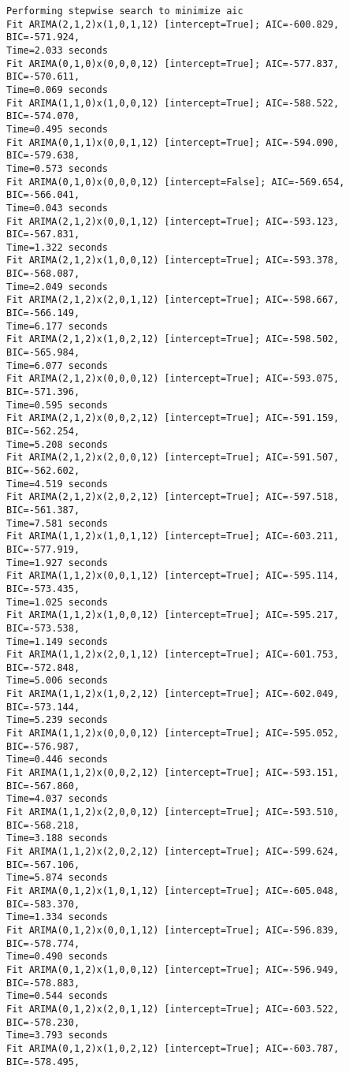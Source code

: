\documentclass[11pt]{article}
\begin{document}
    \begin{Verbatim}[commandchars=\\\{\}]
Performing stepwise search to minimize aic
Fit ARIMA(2,1,2)x(1,0,1,12) [intercept=True]; AIC=-600.829, BIC=-571.924,
Time=2.033 seconds
Fit ARIMA(0,1,0)x(0,0,0,12) [intercept=True]; AIC=-577.837, BIC=-570.611,
Time=0.069 seconds
Fit ARIMA(1,1,0)x(1,0,0,12) [intercept=True]; AIC=-588.522, BIC=-574.070,
Time=0.495 seconds
Fit ARIMA(0,1,1)x(0,0,1,12) [intercept=True]; AIC=-594.090, BIC=-579.638,
Time=0.573 seconds
Fit ARIMA(0,1,0)x(0,0,0,12) [intercept=False]; AIC=-569.654, BIC=-566.041,
Time=0.043 seconds
Fit ARIMA(2,1,2)x(0,0,1,12) [intercept=True]; AIC=-593.123, BIC=-567.831,
Time=1.322 seconds
Fit ARIMA(2,1,2)x(1,0,0,12) [intercept=True]; AIC=-593.378, BIC=-568.087,
Time=2.049 seconds
Fit ARIMA(2,1,2)x(2,0,1,12) [intercept=True]; AIC=-598.667, BIC=-566.149,
Time=6.177 seconds
Fit ARIMA(2,1,2)x(1,0,2,12) [intercept=True]; AIC=-598.502, BIC=-565.984,
Time=6.077 seconds
Fit ARIMA(2,1,2)x(0,0,0,12) [intercept=True]; AIC=-593.075, BIC=-571.396,
Time=0.595 seconds
Fit ARIMA(2,1,2)x(0,0,2,12) [intercept=True]; AIC=-591.159, BIC=-562.254,
Time=5.208 seconds
Fit ARIMA(2,1,2)x(2,0,0,12) [intercept=True]; AIC=-591.507, BIC=-562.602,
Time=4.519 seconds
Fit ARIMA(2,1,2)x(2,0,2,12) [intercept=True]; AIC=-597.518, BIC=-561.387,
Time=7.581 seconds
Fit ARIMA(1,1,2)x(1,0,1,12) [intercept=True]; AIC=-603.211, BIC=-577.919,
Time=1.927 seconds
Fit ARIMA(1,1,2)x(0,0,1,12) [intercept=True]; AIC=-595.114, BIC=-573.435,
Time=1.025 seconds
Fit ARIMA(1,1,2)x(1,0,0,12) [intercept=True]; AIC=-595.217, BIC=-573.538,
Time=1.149 seconds
Fit ARIMA(1,1,2)x(2,0,1,12) [intercept=True]; AIC=-601.753, BIC=-572.848,
Time=5.006 seconds
Fit ARIMA(1,1,2)x(1,0,2,12) [intercept=True]; AIC=-602.049, BIC=-573.144,
Time=5.239 seconds
Fit ARIMA(1,1,2)x(0,0,0,12) [intercept=True]; AIC=-595.052, BIC=-576.987,
Time=0.446 seconds
Fit ARIMA(1,1,2)x(0,0,2,12) [intercept=True]; AIC=-593.151, BIC=-567.860,
Time=4.037 seconds
Fit ARIMA(1,1,2)x(2,0,0,12) [intercept=True]; AIC=-593.510, BIC=-568.218,
Time=3.188 seconds
Fit ARIMA(1,1,2)x(2,0,2,12) [intercept=True]; AIC=-599.624, BIC=-567.106,
Time=5.874 seconds
Fit ARIMA(0,1,2)x(1,0,1,12) [intercept=True]; AIC=-605.048, BIC=-583.370,
Time=1.334 seconds
Fit ARIMA(0,1,2)x(0,0,1,12) [intercept=True]; AIC=-596.839, BIC=-578.774,
Time=0.490 seconds
Fit ARIMA(0,1,2)x(1,0,0,12) [intercept=True]; AIC=-596.949, BIC=-578.883,
Time=0.544 seconds
Fit ARIMA(0,1,2)x(2,0,1,12) [intercept=True]; AIC=-603.522, BIC=-578.230,
Time=3.793 seconds
Fit ARIMA(0,1,2)x(1,0,2,12) [intercept=True]; AIC=-603.787, BIC=-578.495,

\end{Verbatim}
\end{document}
